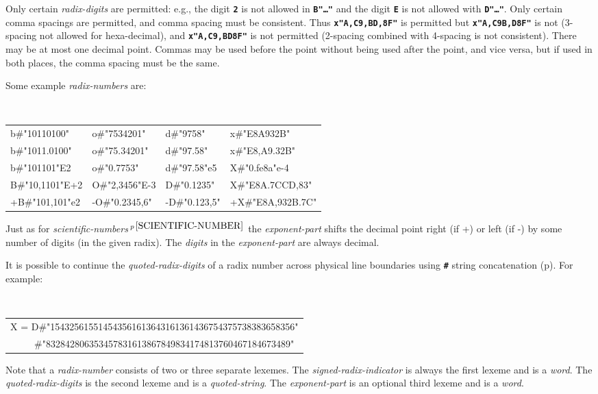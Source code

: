 \documentclass[12pt]{article}
\newcommand{\TT}[1]{{\tt \bfseries #1}}
\newcommand{\pagref}[1]{p\pageref{#1}}
\newcommand{\pagnote}[1]{$\,^{p\,\pageref{#1}}$}
\newenvironment{indpar}[1][0.3in]%
	{\begin{list}{}%
		     {\setlength{\itemsep}{0in}%
		      \setlength{\topsep}{0in}%
		      \setlength{\parsep}{1ex}%
		      \setlength{\labelwidth}{#1}%
		      \setlength{\leftmargin}{#1}%
		      \addtolength{\leftmargin}{\labelsep}}%
	 \item}%
	{\end{list}}
\begin{document}
Only certain {\em radix-digits} are permitted: e.g., the digit \TT{2}
is not allowed in \TT{B"\ldots"} and the digit \TT{E} is not allowed
with \TT{D"\ldots"}.  Only certain comma spacings are permitted, and comma
spacing must be consistent.  Thus \TT{x"A,C9,BD,8F"} is permitted but
\TT{x"A,C9B,D8F"} is not (3-spacing not allowed for hexa-decimal),
and \TT{x"A,C9,BD8F"} is not permitted (2-spacing combined with
4-spacing is not consistent).
There may be at most one decimal point.
Commas may be used before the point without being used after the
point, and vice versa, but if used in both places, the comma spacing
must be the same.

Some example {\em radix-numbers} are:

\begin{indpar}[0.1in]
\tt
\begin{tabular}{@{}l@{~~}l@{~~}l@{~~}l@{}}
b\#"10110100"	& o\#"7534201"   & d\#"9758"	& x\#"E8A932B" \\
b\#"1011.0100"	& o\#"75.34201"  & d\#"97.58"	& x\#"E8,A9.32B" \\
b\#"101101"E2	& o\#"0.7753"    & d\#"97.58"e5	& X\#"0.fe8a"e-4 \\
B\#"10,1101"E+2	& O\#"2,3456"E-3 & D\#"0.1235"	& X\#"E8A.7CCD,83" \\
+B\#"101,101"e2	& -O\#"0.2345,6" & -D\#"0.123,5" & +X\#"E8A,932B.7C" \\
\end{tabular}
\end{indpar}

Just as for {\em scientific-numbers}\pagnote{SCIENTIFIC-NUMBER}
the {\em exponent-part} shifts the decimal point right (if +) or left (if -)
by some number of digits (in the given radix).  The {\em digits}
in the {\em exponent-part} are always decimal.

It is possible to continue the {\em quoted-radix-digits} of a radix number
across physical line
boundaries using \TT{\#} string concatenation
(\pagref{STRING-CONCATENATION}).  For example:
\begin{center}
\tt
\begin{tabular}{l}
X = D\#"154325615514543561613643161361436754375738383658356" \\
~~~~~\#"832842806353457831613867849834174813760467184673489"
\end{tabular}
\end{center}

Note that a {\em radix-number} consists of two or three separate
lexemes.  The {\em signed-radix-indicator} is always the first
lexeme and is a {\em word}.  The {\em quoted-radix-digits}
is the second lexeme and is a {\em quoted-string}.  The
{\em exponent-part} is an optional third lexeme and is a {\em word}.
\end{document}
